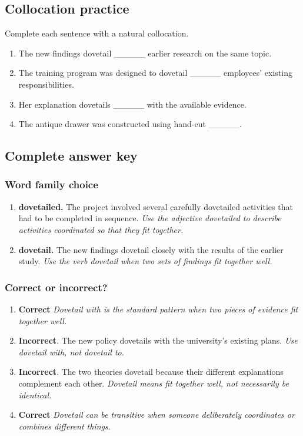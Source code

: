 \documentclass[11pt]{article}
\begin{document}
\subsection{Collocation practice}
Complete each sentence with a natural collocation.

\begin{enumerate}
  \item The new findings dovetail \_\_\_\_\_ earlier research on the same topic.
  \item The training program was designed to dovetail \_\_\_\_\_ employees' existing responsibilities.
  \item Her explanation dovetails \_\_\_\_\_ with the available evidence.
  \item The antique drawer was constructed using hand-cut \_\_\_\_\_.
\end{enumerate}

\subsection{Complete answer key}
\subsubsection{Word family choice}
\begin{enumerate}
  \item \textbf{dovetailed.} The project involved several carefully dovetailed activities that had to be completed in sequence. \emph{Use the adjective dovetailed to describe activities coordinated so that they fit together.}
  \item \textbf{dovetail.} The new findings dovetail closely with the results of the earlier study. \emph{Use the verb dovetail when two sets of findings fit together well.}
\end{enumerate}

\subsubsection{Correct or incorrect?}
\begin{enumerate}
  \item \textbf{Correct} \emph{Dovetail with is the standard pattern when two pieces of evidence fit together well.}
  \item \textbf{Incorrect}. The new policy dovetails with the university's existing plans. \emph{Use dovetail with, not dovetail to.}
  \item \textbf{Incorrect}. The two theories dovetail because their different explanations complement each other. \emph{Dovetail means fit together well, not necessarily be identical.}
  \item \textbf{Correct} \emph{Dovetail can be transitive when someone deliberately coordinates or combines different things.}
\end{enumerate}
\end{document}
